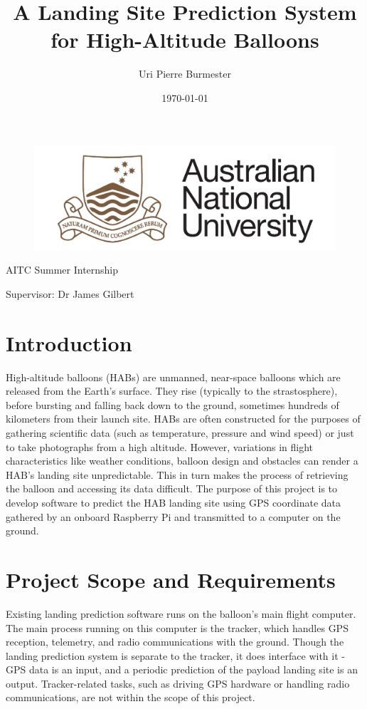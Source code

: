 \documentclass[11pt]{article}
\title{A Landing Site Prediction System for High-Altitude Balloons \large}
\author{Uri Pierre Burmester}
\date{\today}
\begin{document}
\begin{figure} \centering
  \includegraphics[width=0.5\linewidth]{ANU.png}
\end{figure}

\maketitle

\centerline{AITC Summer Internship}  
\centerline{Supervisor: Dr James Gilbert} 

\newpage

\tableofcontents

\newpage

\section{Introduction}
High-altitude balloons (HABs) are unmanned, near-space balloons which are released from the Earth's surface. They rise (typically to the strastosphere), before bursting and falling back down to the ground, sometimes hundreds of kilometers from their launch site. HABs are often constructed for the purposes of gathering scientific data (such as temperature, pressure and wind speed) or just to take photographs from a high altitude. However, variations in flight characteristics like weather conditions, balloon design and obstacles can render a HAB's landing site unpredictable. This in turn makes the process of retrieving the balloon and accessing its data difficult. The purpose of this project is to develop software to predict the HAB landing site using GPS coordinate data gathered by an onboard Raspberry Pi and transmitted to a computer on the ground. 

\section{Project Scope and Requirements}

Existing landing prediction software runs on the balloon's main flight computer.  The main process running on this computer is the tracker, which handles GPS reception, telemetry, and radio communications with the ground. Though the landing prediction system is separate to the tracker, it does interface with it -  GPS data is an input, and a periodic prediction of the payload landing site is an output.  Tracker-related tasks, such as driving GPS hardware or handling radio communications, are not within the scope of this project.
\end{document}
